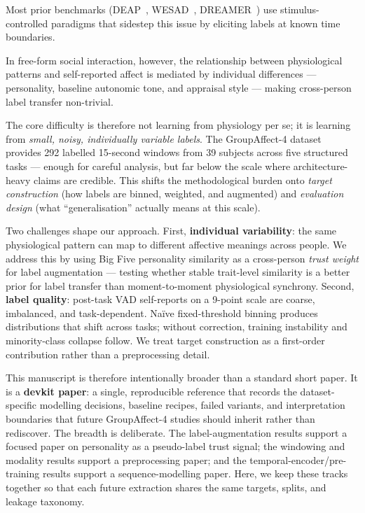\documentclass[sigconf,nonacm]{acmart}
\begin{document}
\begin{sloppypar}
Most prior benchmarks (DEAP~\cite{koelstra2012deap},
WESAD~\cite{schmidt2018wesad}, DREAMER~\cite{katsigiannis2018dreamer})
use stimulus-controlled paradigms that sidestep this issue by eliciting
labels at known time boundaries.
\end{sloppypar}
In free-form social interaction, however, the relationship between
physiological patterns and self-reported affect is mediated by individual
differences --- personality, baseline autonomic tone, and appraisal
style --- making cross-person label transfer non-trivial.

The core difficulty is therefore not learning from physiology per se;
it is learning from \emph{small, noisy, individually variable labels}.
The GroupAffect-4 dataset~\cite{groupaffect4} provides 292 labelled
15-second windows from 39 subjects across five structured tasks
--- enough for careful analysis, but far below the scale where
architecture-heavy claims are credible.
This shifts the methodological burden onto \emph{target construction}
(how labels are binned, weighted, and augmented) and
\emph{evaluation design} (what ``generalisation'' actually means at
this scale).

Two challenges shape our approach.
First, \textbf{individual variability}: the same physiological pattern
can map to different affective meanings across people.
We address this by using Big Five personality similarity as a
cross-person \emph{trust weight} for label augmentation --- testing
whether stable trait-level similarity is a better prior for label
transfer than moment-to-moment physiological synchrony.
Second, \textbf{label quality}: post-task VAD self-reports on a 9-point
scale are coarse, imbalanced, and task-dependent.
Naïve fixed-threshold binning produces distributions that shift across
tasks; without correction, training instability and minority-class
collapse follow.
We treat target construction as a first-order contribution rather
than a preprocessing detail.

This manuscript is therefore intentionally broader than a standard short
paper.
It is a \textbf{devkit paper}: a single, reproducible reference that records
the dataset-specific modelling decisions, baseline recipes, failed variants,
and interpretation boundaries that future GroupAffect-4 studies should inherit
rather than rediscover.
The breadth is deliberate.
The label-augmentation results support a focused paper on personality as a
pseudo-label trust signal; the windowing and modality results support a
preprocessing paper; and the temporal-encoder/pre-training results support a
sequence-modelling paper.
Here, we keep these tracks together so that each future extraction shares the
same targets, splits, and leakage taxonomy.
\end{document}
